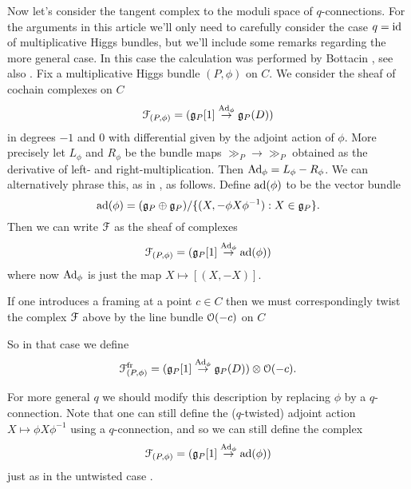 \documentclass[10pt, oneside]{article}
\newcommand{\fr}{\mathrm{fr}}
\renewcommand{\ad}{\mr{ad}}
\newcommand{\Ad}{\mr{Ad}}
\begin{document}
Now let's consider the tangent complex to the moduli space of $q$-connections.  For the arguments in this article we'll only need to carefully consider the case $q=\operatorname{id}$ of multiplicative Higgs bundles, but we'll include some remarks regarding the more general case.  In this case the calculation was performed by Bottacin \cite{Bottacin}, see also \cite[Section 4]{HurtubiseMarkman}. Fix a multiplicative Higgs bundle $(P,\phi)$ on $C$.  We consider the sheaf of cochain complexes on $C$
\[\mc F_{(P,\phi)} = (\gg_P[1] \overset {\Ad_\phi} {\to} \gg_P(D))\]
in degrees $-1$ and 0 with differential given by the adjoint action of $\phi$.  More precisely let $L_\phi$ and $R_\phi$ be the bundle maps $\gg_P \to \gg_P$ obtained as the derivative of left- and right-multiplication.  Then $\Ad_\phi = L_\phi - R_\phi$.  We can alternatively phrase this, as in \cite[Section 4]{HurtubiseMarkman}, as follows.  Define $\ad(\phi)$ to be the vector bundle
\[\ad(\phi) = (\gg_P \oplus \gg_P)/\{(X, -\phi X \phi^{-1}): X \in \gg_P\}.\]
Then we can write $\mathcal{F}$ as the sheaf of complexes
\[\mc F_{(P,\phi)} = (\gg_P[1] \overset {\Ad_\phi} {\to} \ad(\phi))\]
where now $\Ad_\phi$ is just the map $X \mapsto [(X,-X)]$.

\begin{remark}
  If one introduces a framing at a point $c \in C$ then we must correspondingly twist the complex $\mathcal{F}$ above by the line bundle $\mathcal{O}(-c)$ on $C$

  So in that case we define
\[\mc F^\fr_{(P,\phi)} = (\gg_P[1] \overset {\Ad_\phi} {\to} \gg_P(D)) \otimes \OO(-c).\]
\end{remark}

\begin{remark}
For more general $q$ we should modify this description by replacing $\phi$ by a $q$-connection.  Note that one can still define the ($q$-twisted) adjoint action $X \mapsto \phi X \phi^{-1}$ using a $q$-connection, and so we can still define the complex
\[\mc F_{(P,\phi)} = (\gg_P[1] \overset {\Ad_\phi} {\to} \ad(\phi))\]
just as in the untwisted case .
\end{remark}
\end{document}
